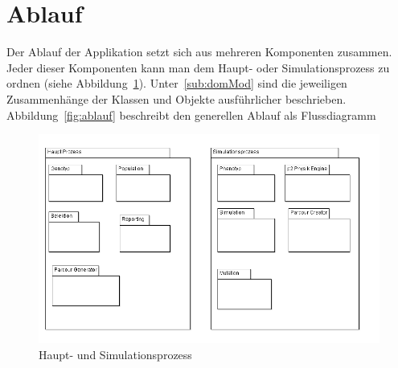   \section{Ablauf\label{sec:Ablauf}}

    Der Ablauf der Applikation setzt sich aus mehreren Komponenten zusammen.
    Jeder dieser Komponenten kann man dem Haupt- oder Simulationsprozess zu ordnen (siehe Abbildung~\ref{fig:hauptSimuProzesse}).
    Unter~\ref{sub:domMod} sind die jeweiligen Zusammenhänge der Klassen und Objekte ausführlicher beschrieben.
    Abbildung~\ref{fig:ablauf} beschreibt den generellen Ablauf als Flussdiagramm
    \begin{figure}[H]
      \includegraphics[scale=0.45]{graphics/haupt_simulations_prozess}
      \caption{Haupt- und Simulationsprozess\label{fig:hauptSimuProzesse}}
    \end{figure}
